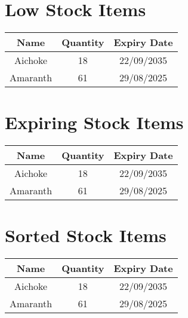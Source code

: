 \documentclass{article}
\begin{document}
\section*{Low Stock Items}
\begin{tabular}{|c|c|c|}
\hline
Name & Quantity & Expiry Date\\
\hline
Aichoke & 18 & 22/09/2035 \\
\hline
Amaranth & 61 & 29/08/2025 \\
\hline
\end{tabular}

\section*{Expiring Stock Items}
\begin{tabular}{|c|c|c|}
\hline
Name & Quantity & Expiry Date\\
\hline
Aichoke & 18 & 22/09/2035 \\
\hline
Amaranth & 61 & 29/08/2025 \\
\hline
\end{tabular}

\section*{Sorted Stock Items}
\begin{tabular}{|c|c|c|}
\hline
Name & Quantity & Expiry Date\\
\hline
Aichoke & 18 & 22/09/2035 \\
\hline
Amaranth & 61 & 29/08/2025 \\
\hline
\end{tabular}
\end{document}
